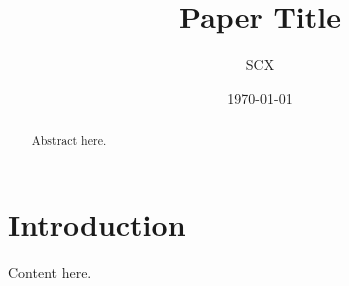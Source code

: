 \documentclass[12pt,a4paper]{article}
\title{Paper Title}
\author{SCX}
\date{\today}
\theoremstyle{remark}
\begin{document}
\maketitle

\begin{abstract}
Abstract here.
\end{abstract}

\section{Introduction}
Content here.



\end{document}
